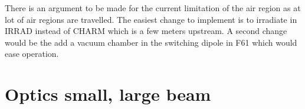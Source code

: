 \documentclass[a4paper,
               biblatex,     %
               ]{jacow}
\begin{document}
There is an argument to be made for the current limitation of the air region as at lot of air regions are travelled. The easiest change to implement is to irradiate in IRRAD instead of CHARM which is a few meters upstream. A second change would be the add a vacuum chamber in the switching dipole in F61 which would ease operation.









\section{Optics small, large beam}



\end{document}
